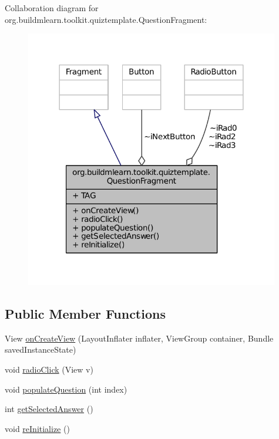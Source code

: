 Collaboration diagram for org.\-buildmlearn.\-toolkit.\-quiztemplate.\-Question\-Fragment\-:
\nopagebreak
\begin{figure}[H]
\begin{center}
\leavevmode
\includegraphics[width=314pt]{da/d0c/classorg_1_1buildmlearn_1_1toolkit_1_1quiztemplate_1_1QuestionFragment__coll__graph}
\end{center}
\end{figure}
\subsection*{Public Member Functions}
\begin{DoxyCompactItemize}
\item 
View \hyperlink{classorg_1_1buildmlearn_1_1toolkit_1_1quiztemplate_1_1QuestionFragment_abb793ebbf73449b93a9dd85f3786da07}{on\-Create\-View} (Layout\-Inflater inflater, View\-Group container, Bundle saved\-Instance\-State)
\item 
void \hyperlink{classorg_1_1buildmlearn_1_1toolkit_1_1quiztemplate_1_1QuestionFragment_a196e5caed520e173fd52c1f43d8f4a31}{radio\-Click} (View v)
\item 
void \hyperlink{classorg_1_1buildmlearn_1_1toolkit_1_1quiztemplate_1_1QuestionFragment_aa7710314d3a07072c8d67e3625826590}{populate\-Question} (int index)
\item 
int \hyperlink{classorg_1_1buildmlearn_1_1toolkit_1_1quiztemplate_1_1QuestionFragment_a72d22e68fe4a0e7e57e978e4b4cdd618}{get\-Selected\-Answer} ()
\item 
void \hyperlink{classorg_1_1buildmlearn_1_1toolkit_1_1quiztemplate_1_1QuestionFragment_a815352bbacc2869c92bf4dfbbf5c3851}{re\-Initialize} ()
\end{DoxyCompactItemize}
